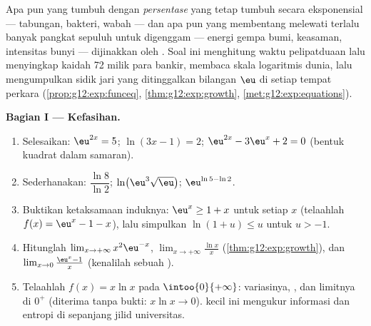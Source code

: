 \begin{problem}
\label{pb:g12:exp:1}
Apa pun yang tumbuh dengan \emph{persentase} yang tetap tumbuh secara
eksponensial --- tabungan, bakteri, wabah --- dan apa pun yang membentang
melewati terlalu banyak pangkat sepuluh untuk digenggam --- energi gempa bumi,
keasaman, intensitas bunyi --- dijinakkan oleh . Soal ini
menghitung waktu pelipatduaan lalu menyingkap kaidah 72 milik para bankir,
membaca skala logaritmis dunia, lalu mengumpulkan sidik jari yang ditinggalkan
bilangan $\eu$ di setiap tempat  perkara
(\cref{prop:g12:exp:funceq}, \cref{thm:g12:exp:growth},
\cref{met:g12:exp:equations}).

\medskip
\noindent\textbf{Bagian I --- Kefasihan.}
\begin{enumerate}
  \item Selesaikan: $\eu^{2x} = 5$; \quad $\ln(3x - 1) = 2$; \quad
        $\eu^{2x} - 3\eu^x + 2 = 0$ (bentuk kuadrat dalam samaran).
  \item Sederhanakan: $\dfrac{\ln 8}{\ln 2}$; \quad
        $\ln\!\left(\eu^3 \sqrt{\eu}\right)$; \quad
        $\eu^{\ln 5 - \ln 2}$.
  \item Buktikan ketaksamaan induknya: $\eu^x \geq 1 + x$ untuk setiap
         $x$ (telaahlah $f(x) = \eu^x - 1 - x$), lalu simpulkan
        $\ln(1 + u) \leq u$ untuk $u > -1$.
  \item Hitunglah
        $\lim_{x \to +\infty} x^2 \eu^{-x}$,
        $\lim_{x \to +\infty} \frac{\ln x}{x}$
        (\cref{thm:g12:exp:growth}), dan
        $\lim_{x \to 0} \frac{\eu^x - 1}{x}$ (kenalilah sebuah
        ).
  \item Telaahlah $f(x) = x \ln x$ pada $\intoo{0}{+\infty}$:
        variasinya, , dan limitnya di $0^+$ (diterima tanpa bukti:
        $x \ln x \to 0$).  kecil ini mengukur
        informasi dan entropi di sepanjang jilid universitas.
\end{enumerate}


\end{problem}
